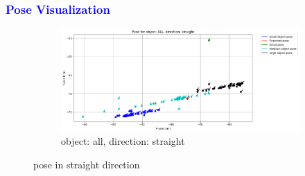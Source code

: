 \documentclass[10pt,a4paper]{article}
\begin{document}
						 \subsubsection{\textcolor{blue}{Pose Visualization}}
								
								\begin{figure}[H]
%									
									
									\begin{subfigure}{\textwidth}
										\centering
										\includegraphics[width=0.8\linewidth]{img/pose_all_straight.png}
										\caption{object: all, direction: straight}
										\label{fig:object: all, direction: straight}
									\end{subfigure}
									
									\caption{pose in straight direction}
									\label{fig:pose in straight direction}
								\end{figure}
								
\end{document}

